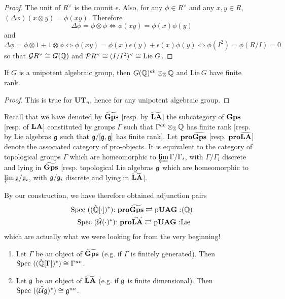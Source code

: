 \begin{proof}
The unit of $R^\vee$ is the counit $\epsilon$. Also, for any $\phi\in R^\vee$ and any $x,y\in R$, $(\Delta\phi)(x\otimes y)=\phi(xy)$. Therefore
\[
\Delta\phi=\phi\otimes\phi \Leftrightarrow \phi(xy)=\phi(x)\phi(y)
\]
and
\[
\Delta\phi=\phi\otimes1+1\otimes\phi \Leftrightarrow \phi(xy)=\phi(x)\epsilon(y)+\epsilon(x)\phi(y)\Leftrightarrow \phi(I^2)=\phi(R/I)=0
\]
so that $\mathcal{G} R^\vee\cong G(\mathbb{Q})$ and $\mathcal{P} R^\vee\cong (I/I^2)^\vee\cong\mathrm{Lie~} G$.
\end{proof}

%
\begin{prop}
If $G$ is a unipotent algebraic group, then $G(\mathbb{Q})^{ab}\otimes_{\mathbb{Z}}\mathbb{Q}$ and $\mathrm{Lie~} G$ have finite rank.
\end{prop}

\begin{proof}
This is true for $\mathbf{UT}_n$, hence for any unipotent algebraic group.
\end{proof}

Recall that we have denoted by $\widetilde{\operatorname{\bf{Gps}}}$ [resp. by $\widetilde{\operatorname{\bf{LA}}}$] the subcategory of $\operatorname{\bf{Gps}}$ [resp. of $\operatorname{\bf{LA}}$] constituted by groups $\Gamma$ such that $\Gamma^{ab}\otimes_{\mathbb{Z}}\mathbb{Q}$ has finite rank [resp. by Lie algebras $\mathfrak{g}$ such that $\mathfrak{g}/[\mathfrak{g},\mathfrak{g}]$ has finite rank]. Let $\bf{pro}\widetilde{\operatorname{\bf{Gps}}}$ [resp. $\bf{pro}\widetilde{\operatorname{\bf{LA}}}$] denote the associated category of pro-objects. It is equivalent to the category of topological groups $\Gamma$ which are homeomorphic to $\varprojlim \Gamma/\Gamma_i$, with $\Gamma/\Gamma_i$ discrete and lying in $\widetilde{\operatorname{\bf{Gps}}}$ [resp. topological Lie algebras $\mathfrak{g}$ which are homeomorphic to $\varprojlim \mathfrak{g}/\mathfrak{g}_i$, with $\mathfrak{g}/\mathfrak{g}_i$ discrete and lying in $\widetilde{\operatorname{\bf{LA}}}$]. 

By our construction, we have therefore obtained adjunction pairs
\begin{equation}\label{a}\begin{aligned}
\mathrm{Spec}~((\hat{\mathbb{Q}}[\cdot])^*)\negmedspace: {\bf{pro}}\widetilde{\operatorname{\bf{Gps}}}\rightleftarrows \operatorname{p\bf{UAG}}:\negmedspace (\mathbb{Q})
\\
\mathrm{Spec}~(\hat{\mathcal{U}}(\cdot)^*)\negmedspace: {\bf{pro}}\widetilde{\operatorname{\bf{LA}}}\rightleftarrows \operatorname{p\bf{UAG}}:\negmedspace \mathrm{Lie~}
\end{aligned}
\end{equation}
which are actually what we were looking for from the very beginning!

\begin{cor}
\begin{enumerate}
	\item Let $\Gamma$ be an object of $\widetilde{\operatorname{\bf{Gps}}}$ (e.g. if $\Gamma$ is finitely generated). Then $\mathrm{Spec}~((\hat{\mathbb{Q}}[\Gamma])^*)\cong\Gamma^{un}$. 
	\item Let $\mathfrak{g}$ be an object of $\widetilde{\operatorname{\bf{LA}}}$ (e.g. if $\mathfrak{g}$ is finite dimensional). Then $\mathrm{Spec}~((\hat{\mathcal{U}}\mathfrak{g})^*)\cong\mathfrak{g}^{un}$. 
\end{enumerate}
\end{cor}

